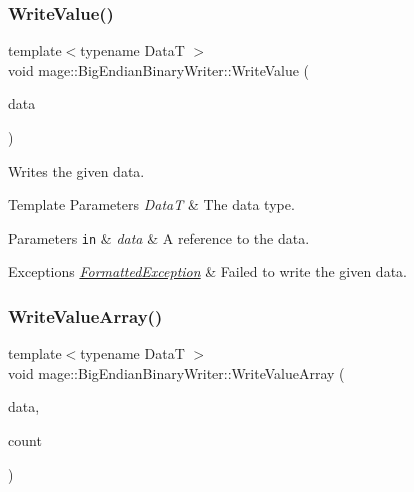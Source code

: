 \subsubsection{\texorpdfstring{Write\+Value()}{WriteValue()}}
{\footnotesize\ttfamily template$<$typename DataT $>$ \\
void mage\+::\+Big\+Endian\+Binary\+Writer\+::\+Write\+Value (\begin{DoxyParamCaption}\item[{const DataT \&}]{data }\end{DoxyParamCaption})\hspace{0.3cm}{\ttfamily [protected]}}

Writes the given data.


\begin{DoxyTemplParams}{Template Parameters}
{\em DataT} & The data type. \\
\hline
\end{DoxyTemplParams}

\begin{DoxyParams}[1]{Parameters}
\mbox{\tt in}  & {\em data} & A reference to the data. \\
\hline
\end{DoxyParams}

\begin{DoxyExceptions}{Exceptions}
{\em \hyperlink{structmage_1_1_formatted_exception}{Formatted\+Exception}} & Failed to write the given data. \\
\hline
\end{DoxyExceptions}
\hypertarget{classmage_1_1_big_endian_binary_writer_a70459f96b5389052d6e090e124c5468b}{}\label{classmage_1_1_big_endian_binary_writer_a70459f96b5389052d6e090e124c5468b} 
\subsubsection{\texorpdfstring{Write\+Value\+Array()}{WriteValueArray()}}
{\footnotesize\ttfamily template$<$typename DataT $>$ \\
void mage\+::\+Big\+Endian\+Binary\+Writer\+::\+Write\+Value\+Array (\begin{DoxyParamCaption}\item[{const DataT $\ast$}]{data,  }\item[{size\+\_\+t}]{count }\end{DoxyParamCaption})\hspace{0.3cm}{\ttfamily [protected]}}


